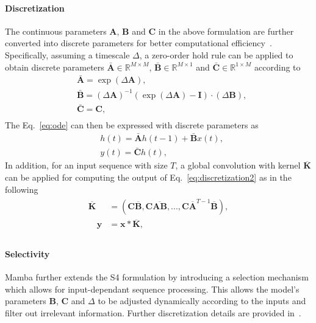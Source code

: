 \documentclass[10pt,twocolumn,letterpaper]{article}
\begin{document}
\paragraph{Discretization} The continuous parameters $\bm{A}$, $\bm{B}$ and $\bm{C}$ in the above formulation are further converted into discrete parameters for better computational efficiency~\cite{gu2021combining}. Specifically, assuming a timescale $\Delta$, a zero-order hold rule can be applied to obtain discrete parameters $\bm{\bar{A}}\in\mathbb{R}^{M\times M}$, $\bm{\bar{B}} \in \mathbb{R}^{M\times 1}$ and $\bm{\bar{C}}\in\mathbb{R}^{1 \times M}$ according to
\begin{equation} \label{eq:discretization}
\begin{aligned}
&\bar{\bm{A}} = \exp{(\Delta \bm{A})}, \\
&\bar{\bm{B}} =(\Delta \bm{A})^{-1}(\exp{(\Delta \bm{A})} - \bm{I}) \cdot (\Delta \bm{B}), \\
&\bar{\bm{C}} = \bm{C}, \\
\end{aligned}
\end{equation}
The Eq.~\ref{eq:ode} can then be expressed with discrete parameters as
\begin{equation} \label{eq:discretization2}
\begin{aligned}
&h(t) = \bar{\bm{A}}h(t-1) + \bar{\bm{B}}x(t), \\
&y(t) = \bar{\bm{C}}h(t),
\end{aligned}
\end{equation}
In addition, for an input sequence with size $T$, a global convolution with kernel $\bm{\overline{K}}$ can be applied for computing the output of Eq.~\ref{eq:discretization2} as in the following
\begin{align}
    \begin{split}
       \bm{\overline{K}} &= (\bm{C}\bm{\overline{B}},\bm{C}\overline{\bm{A}\bm{B}}, ..., \bm{C}\bm{\overline{A}}^{T-1}\bm{\overline{B}}), \\
        \quad \bm{y} &= \bm{x} * \bm{\overline{K}}, \\
    \end{split}
\end{align}
\paragraph{Selectivity} Mamba further extends the S4 formulation by introducing a selection mechanism which allows for input-dependant sequence processing. This allows the model's parameters $\bm{B}$, $\bm{C}$ and $\Delta$ to be adjusted dynamically according to the inputs and filter out irrelevant information. Further discretization details are provided in~\cite{gu2023mamba}. 
\end{document}
